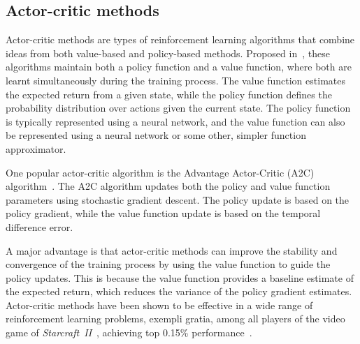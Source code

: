 \subsection{Actor-critic methods}
Actor-critic methods are types of reinforcement learning algorithms that combine ideas from both value-based and policy-based methods.
Proposed in~\autocite{konda1999}, these algorithms maintain both a policy function and a value function, where both are learnt simultaneously during the training process.
The value function estimates the expected return from a given state, while the policy function defines the probability distribution over actions given the current state.
The policy function is typically represented using a neural network, and the value function can also be represented using a neural network or some other, simpler function approximator.

One popular actor-critic algorithm is the Advantage Actor-Critic (A2C) algorithm~\autocite{mnih2016}.
The A2C algorithm updates both the policy and value function parameters using stochastic gradient descent.
The policy update is based on the policy gradient, while the value function update is based on the temporal difference error.

A major advantage is that actor-critic methods can improve the stability and convergence of the training process by using the value function to guide the policy updates.
This is because the value function provides a baseline estimate of the expected return, which reduces the variance of the policy gradient estimates.
Actor-critic methods have been shown to be effective in a wide range of reinforcement learning problems, exempli gratia, among all players of the video game of \textit{Starcraft~II}~\autocite{starcraft}, achieving top 0.15\% performance~\autocite{vinyals2019}.